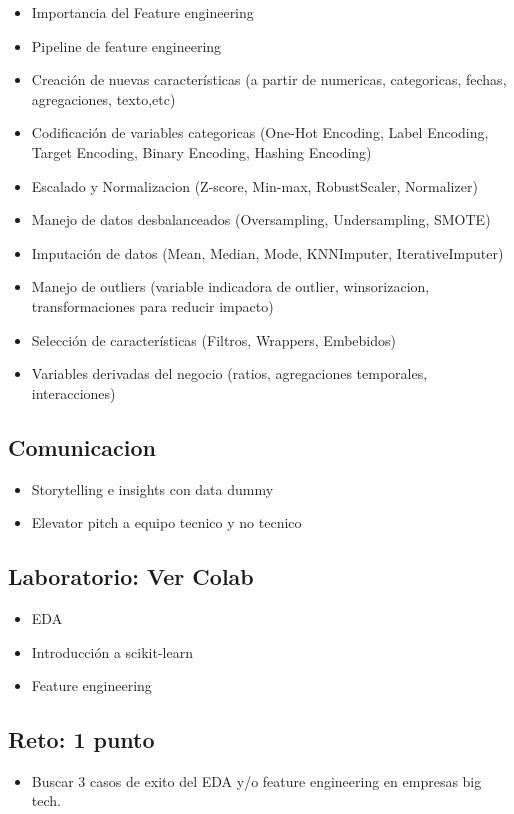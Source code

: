 \documentclass[12pt,a4paper,openany,oneside]{book}
\begin{document}
\begin{itemize}
\begin{itemize}
    \item Importancia del Feature engineering
    \item Pipeline de feature engineering
    \item Creación de nuevas características (a partir de numericas, categoricas, fechas, agregaciones, texto,etc)
    \item Codificación de variables categoricas (One-Hot Encoding, Label Encoding, Target Encoding, Binary Encoding, Hashing Encoding)
    \item Escalado y Normalizacion (Z-score, Min-max, RobustScaler, Normalizer)
    \item Manejo de datos desbalanceados (Oversampling, Undersampling, SMOTE)
    \item Imputación de datos (Mean, Median, Mode, KNNImputer, IterativeImputer)
    \item Manejo de outliers (variable indicadora de outlier, winsorizacion, transformaciones para reducir impacto)
    \item Selección de características (Filtros, Wrappers, Embebidos)
    \item Variables derivadas del negocio (ratios, agregaciones temporales, interacciones)
    
\end{itemize}

\subsection{Comunicacion}
\begin{itemize}
    \item Storytelling e insights con data dummy
    \item Elevator pitch a equipo tecnico y no tecnico
\end{itemize}

\subsection{Laboratorio: Ver Colab}
\begin{itemize}
    \item EDA
    \item Introducción a scikit-learn
    \item Feature engineering
\end{itemize}

\subsection{Reto: 1 punto}
\begin{itemize}
    \item Buscar 3 casos de exito del EDA y/o feature engineering en empresas big tech.
\end{itemize}


\end{itemize}
\end{document}
